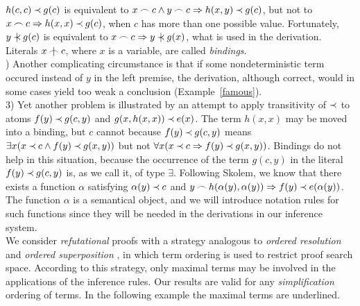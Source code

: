 \(h(c,c)\mathbin{\prec} g(c)\) is equivalent to \(x\mathbin{\frown} c\land y\mathbin{\frown} c\mathrel\Rightarrow h(x,y)\mathbin{\prec}
g(c)\), but not to \(x\mathbin{\frown} c\mathrel\Rightarrow h(x,x)\mathbin{\prec} g(c)\), when $c$ has more than
one possible value.  Fortunately, \(y\notIncl g(c)\) is equivalent to \(x\Int
c\then y\notIncl g(x)\), what is used in the derivation.  Literals 
\(x\notInt c\), where $x$ is a variable, are called {\em bindings}.\\[1ex]
%
) 
Another complicating circumstance is that
if some nondeterministic term occured instead of $y$ in the left premise,
the derivation, although  correct, would in some cases yield too weak a 
conclusion (Example~\ref {famous}).  \\[1ex]
3) Yet another problem is illustrated by
an attempt to apply transitivity of $\mathbin{\prec}$ to atoms \(f(y)\mathbin{\prec} g(c,y)\) and
\( g(x,h(x,x))\mathbin{\prec} e(x)\).  The term $h(x,x)$ may be moved into a binding,
but $c$ cannot because \(f(y)\mathbin{\prec} g(c,y)\) means \(\exists x(x\mathbin{\prec} c\land
f(y)\mathbin{\prec} g(x,y))\) but not \(\forall x(x\mathbin{\prec} c\mathrel\Rightarrow f(y)\mathbin{\prec} g(x,y))\).
Bindings do not help in this situation, because the occurrence of the term $g(c,y)$ 
in the literal \(f(y)\mathbin{\prec} g(c,y)\) is, as we call it, of type $\exists$.  
Following Skolem, we know that
there exists a function $\alpha$ satisfying \(\alpha(y)\mathbin{\prec} c\) and \(y\mathbin{\frown}
h(\alpha(y),\alpha(y))\mathrel\Rightarrow f(y)\mathbin{\prec} e(\alpha(y))\).  The function $\alpha$
is a semantical object, and we will introduce notation rules for such
functions since they will be needed in the derivations in
our inference system.\\[1ex]
%
We consider {\em refutational} proofs with a strategy analogous
to {\em ordered resolution} and {\em ordered superposition} \cite{BG,PP,S-A},
in which term ordering is used to restrict proof search space.  According to this
strategy, only maximal terms may be involved in the applications of
the inference rules. Our results are valid for any {\em simplification} ordering
\cite {Der} of terms.  In the following example the maximal terms are underlined.


